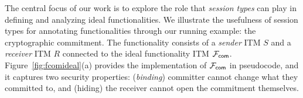
The central focus of our work is to explore the role that \emph{session types} can play in defining and analyzing ideal functionalities.
We illustrate the usefulness of session types for annotating functionalities through our running example: the cryptographic commitment.
The functionality consists of a \emph{sender} ITM $S$ and a \emph{receiver} ITM $R$ connected to 
the ideal functionality ITM $\mathcal{F}_{{\mathsf {com}}}$.
Figure~\ref{fig:fcomideal}(a) provides the implementation of $\mathcal{F}_{{\mathsf {com}}}$ in pseudocode, and 
it captures two security properties: (\emph{binding}) committer cannot change what they committed to, and (hiding) the receiver cannot
open the commitment themselves. 

